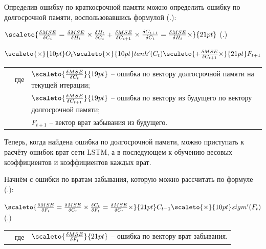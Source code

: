 {  \par \redline Определив ошибку по краткосрочной памяти можно определить ошибку по долгосрочной памяти, воспользовавшись формулой (\thechaptercntr .\theformulacntr):

  \formulaspace \par \redline 
    $\scaleto{\frac{\delta MSE}{\delta C_t} = \frac{\delta MSE}{\delta H_t} \times \frac{\delta H_t}{\delta C_t} + \frac{\delta MSE}{\delta C_{t+1}} \times \frac{\delta C_{t+1}}{\delta C_t} = \frac{\delta MSE}{\delta H_t} \times }{21pt}$
    \hspace{2.6cm} (\thechaptercntr .\theformulacntr) 
    \par \redline $\scaleto{\times}{10pt} O_t \scaleto{\times}{10pt} tanh'(C_t) \scaleto{+ \frac{\delta MSE}{\delta C_{t+1}} \times}{21pt} F_{t+1}$
  \formulaspace \addtocounter{formulacntr}{1}

  \begin{tabular}{p{}p{}p{}}
		& где  & $\scaleto{\frac{\delta MSE}{\delta C_t}}{19pt}$ {--} ошибка по вектору долгосрочной памяти на текущей итерации; \\
    &      & $\scaleto{\frac{\delta MSE}{\delta C_{t+1}}}{19pt}$ {--} ошибка по вектору из будущего по вектору долгосрочной памяти; \\
    &      & $F_{t+1}$ {--} вектор врат забывания из будущего. \\
  \end{tabular}

  \par \redline Теперь, когда найдена ошибка по долгосрочной памяти, можно приступать к расчёту ошибок врат сети LSTM, а в последующем к обучению весовых коэффициентов и коэффициентов каждых врат.

  \par \redline Начнём с ошибки по вратам забывания, которую можно рассчитать по формуле (\thechaptercntr .\theformulacntr):

  \formulaspace \par \redline 
    $\scaleto{\frac{\delta MSE}{\delta F_t} = \frac{\delta MSE}{\delta C_t} \times \frac{\delta C_t}{\delta F_t} = \frac{\delta MSE}{\delta C_t} \times }{21pt} C_{t-1} \scaleto{\times}{10pt} sigm'(F_t)$
    \hfill (\thechaptercntr .\theformulacntr) \redline
  \formulaspace \addtocounter{formulacntr}{1}

  \begin{tabular}{p{}p{}p{}}
		& где  & $\scaleto{\frac{\delta MSE}{\delta F_t}}{21pt}$ {--} ошибка по вектору врат забывания. \\
  \end{tabular}

}
